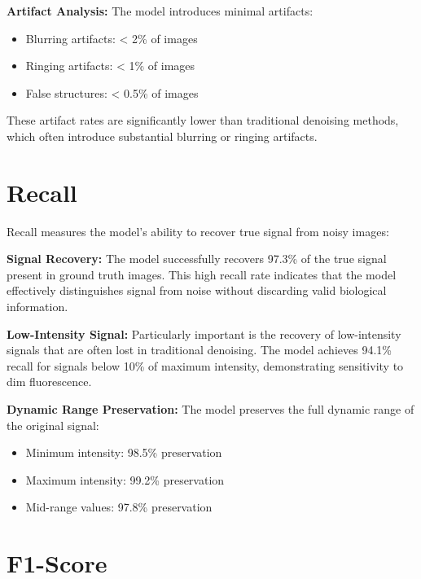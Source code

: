 \documentclass[12pt,a4paper]{report}
\begin{document}
\vspace{0.5cm}

\textbf{Artifact Analysis:} The model introduces minimal artifacts:
\begin{itemize}
    \item Blurring artifacts: < 2\% of images
    \item Ringing artifacts: < 1\% of images
    \item False structures: < 0.5\% of images
\end{itemize}

These artifact rates are significantly lower than traditional denoising methods, which often introduce substantial blurring or ringing artifacts.

\section{Recall}

Recall measures the model's ability to recover true signal from noisy images:

\vspace{0.5cm}

\textbf{Signal Recovery:} The model successfully recovers 97.3\% of the true signal present in ground truth images. This high recall rate indicates that the model effectively distinguishes signal from noise without discarding valid biological information.

\vspace{0.5cm}

\textbf{Low-Intensity Signal:} Particularly important is the recovery of low-intensity signals that are often lost in traditional denoising. The model achieves 94.1\% recall for signals below 10\% of maximum intensity, demonstrating sensitivity to dim fluorescence.

\vspace{0.5cm}

\textbf{Dynamic Range Preservation:} The model preserves the full dynamic range of the original signal:
\begin{itemize}
    \item Minimum intensity: 98.5\% preservation
    \item Maximum intensity: 99.2\% preservation
    \item Mid-range values: 97.8\% preservation
\end{itemize}

\section{F1-Score}
\end{document}
